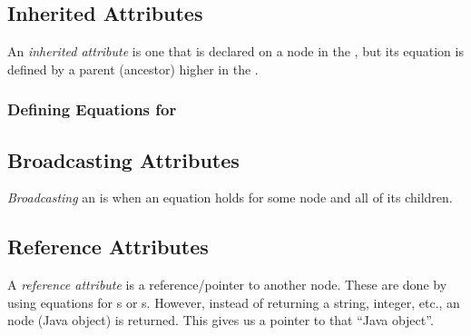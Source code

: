 \subsection{Inherited Attributes}\label{subsec:Inherited_Attributes}
\begin{definition}\label{def:Inherited_Attribute}
  An \emph{inherited attribute} is one that is declared on a node in the , but its equation is defined by a parent (ancestor) higher in the .
\end{definition}

\subsubsection{Defining Equations for }\label{subsubsec:Define_Inherited_Equations}

\subsection{Broadcasting Attributes}\label{subsec:Broadcasting_Attributes}
\begin{definition}[Broadcasting]\label{def:Broadcasting}
  \emph{Broadcasting} an  is when an equation holds for some node and all of its children.
\end{definition}

\subsection{Reference Attributes}\label{subsec:Reference_Attributes}
\begin{definition}\label{def:Reference_Attribute}
  A \emph{reference attribute} is a reference/pointer to another  node.
  These are done by using equations for s or s.
  However, instead of returning a string, integer, etc., an  node (Java object) is returned.
  This gives us a pointer to that ``Java object''.
\end{definition}

